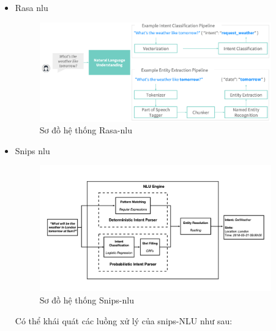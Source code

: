 \begin{itemize}
    \item Rasa \ac{nlu}
          \begin{figure}[htp]
              \centering
              \includegraphics[width=10cm]{images/Rasa-NLU.png}
              \caption{Sơ đồ hệ thống Rasa-\ac{nlu}}
              \label{fig:rasa-nlu}
          \end{figure}
    \item Snips \ac{nlu}
          \begin{figure}[htp]
              \centering
              \includegraphics[width=10cm]{images/Snips-NLU.png}
              \caption{Sơ đồ hệ thống Snips-\ac{nlu}}
              \label{fig:snips-nlu}
          \end{figure}

          Có thể khái quát các luồng xử lý của snips-NLU \cite{snips-nlu} như sau:


\end{itemize}

